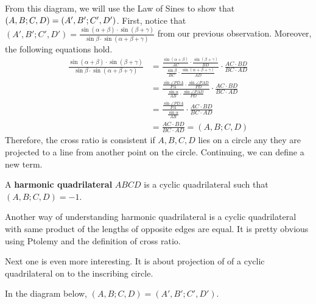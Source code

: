 \documentclass[../../../main.tex]{subfiles}
\begin{document}
From this diagram, we will use the Law of Sines to show that
$(A, B; C, D) \linebreak = (A', B'; C', D')$. First, notice that
$(A', B'; C', D') = \frac{
    \sin(\alpha + \beta) \cdot \sin(\beta + \gamma)
}{ \sin\beta \cdot \sin(\alpha + \beta + \gamma) }$ from our previous
observation. Moreover, the following equations hold.
\begin{align*}
    \frac{
        \sin(\alpha + \beta) \cdot \sin(\beta + \gamma)
    }{ \sin\beta \cdot \sin(\alpha + \beta + \gamma) }
    &= 
    \frac{
        \frac{\sin(\alpha + \beta)}{AC} \cdot
        \frac{\sin(\beta + \gamma)}{BD}
    }{
        \frac{\sin\beta}{BC} \cdot
        \frac{\sin(\alpha + \beta + \gamma)}{AD}
    }
    \cdot \frac{AC \cdot BD}{BC \cdot AD} \\
    &= \frac{
        \frac{\sin\angle{PDA}}{PA} \cdot
        \frac{\sin\angle{PAD}}{PD}
    }{
        \frac{\sin\alpha}{AB} \cdot
        \frac{\sin\angle{PAD}}{PD}
    }
    \cdot \frac{AC \cdot BD}{BC \cdot AD} \\
    &= \frac{ \frac{\sin\angle{PDA}}{PA} }{ \frac{\sin\alpha}{AB} }
        \cdot \frac{AC \cdot BD}{BC \cdot AD} \\
    &= \frac{AC \cdot BD}{BC \cdot AD} = (A, B; C, D)
\end{align*}
Therefore, the cross ratio is consistent if $A, B, C, D$ lies on a
circle any they are projected to a line from another point on the
circle. Continuing, we can define a new term.

\begin{definition}{}{}
A \textbf{harmonic quadrilateral} $ABCD$ is a cyclic quadrilateral
such that $(A, B; C, D) = -1$.
\end{definition}

Another way of understanding harmonic quadrilateral is a cyclic
quadrilateral with same product of the lengths of opposite edges
are equal. It is pretty obvious using Ptolemy and the definition
of cross ratio.

Next one is even more interesting. It is about projection of of a
cyclic quadrilateral on to the inscribing circle.

\begin{important}
In the diagram below, $(A, B; C, D) = (A', B'; C', D')$.
\end{important}
\end{document}
